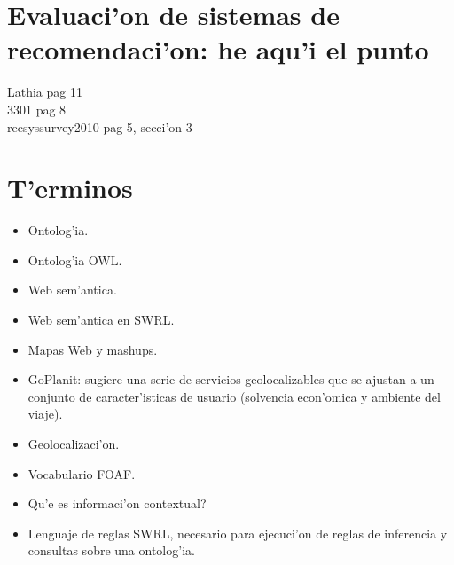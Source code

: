 \documentclass[11pt]{article}
\begin{document}
\section{Evaluaci'on de sistemas de recomendaci'on: he aqu'i el punto}
Lathia pag 11\\
3301 pag 8\\
recsyssurvey2010 pag 5, secci'on 3\\

\section{T'erminos}
\begin{itemize}
\item Ontolog'ia.
\item Ontolog'ia OWL.
\item Web sem'antica.
\item Web sem'antica en SWRL.
\item Mapas Web y mashups.
\item GoPlanit: sugiere una serie de servicios geolocalizables que se ajustan a un conjunto de caracter'isticas de usuario (solvencia econ'omica y ambiente del viaje).
\item Geolocalizaci'on.
\item Vocabulario FOAF.
\item Qu'e es informaci'on contextual?
\item Lenguaje de reglas SWRL, necesario para ejecuci'on de reglas de inferencia y consultas sobre una ontolog'ia.
\end{itemize}





\end{document}
